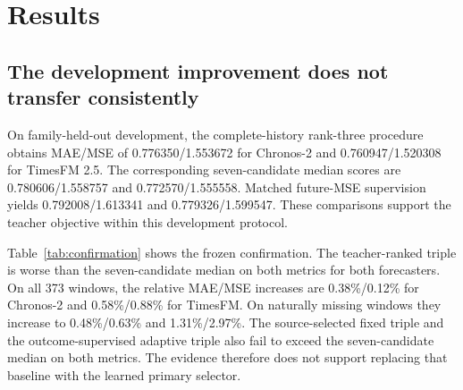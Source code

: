 \documentclass{article}
\begin{document}
\section{Results}

\subsection{The development improvement does not transfer consistently}

On family-held-out development, the complete-history rank-three procedure obtains MAE/MSE of 0.776350/1.553672 for Chronos-2 and 0.760947/1.520308 for TimesFM 2.5. The corresponding seven-candidate median scores are 0.780606/1.558757 and 0.772570/1.555558. Matched future-MSE supervision yields 0.792008/1.613341 and 0.779326/1.599547. These comparisons support the teacher objective within this development protocol.

Table~\ref{tab:confirmation} shows the frozen confirmation. The teacher-ranked triple is worse than the seven-candidate median on both metrics for both forecasters. On all 373 windows, the relative MAE/MSE increases are 0.38\%/0.12\% for Chronos-2 and 0.58\%/0.88\% for TimesFM. On naturally missing windows they increase to 0.48\%/0.63\% and 1.31\%/2.97\%. The source-selected fixed triple and the outcome-supervised adaptive triple also fail to exceed the seven-candidate median on both metrics. The evidence therefore does not support replacing that baseline with the learned primary selector.
\end{document}
